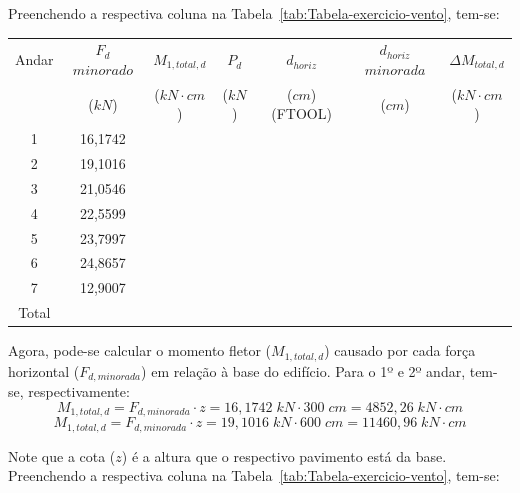 Preenchendo a respectiva coluna na Tabela~\ref{tab:Tabela-exercicio-vento}, tem-se:

\begin{table}[H]
\centering
\begin{tabular}{c|c|c|ccc|c}
\hline
Andar & $F_d$ $minorado$ & $M_{1, total, d}$ & \multicolumn{1}{c|}{$P_d$} & \multicolumn{1}{c|}{$d_{horiz}$} & $d_{horiz}$ $minorada$ & $\Delta M_{total, d}$ \\
 & ($kN$) & ($kN\cdot cm$) & \multicolumn{1}{c|}{($kN$)} & \multicolumn{1}{c|}{($cm$) (FTOOL)} & ($cm$) & ($kN\cdot cm$) \\ \hline
1 & 16,1742 &  & \multicolumn{1}{c|}{} & \multicolumn{1}{c|}{} &  &  \\
2 & 19,1016 &  & \multicolumn{1}{c|}{} & \multicolumn{1}{c|}{} &  &  \\
3 & 21,0546 &  & \multicolumn{1}{c|}{} & \multicolumn{1}{c|}{} &  &  \\
4 & 22,5599 &  & \multicolumn{1}{c|}{} & \multicolumn{1}{c|}{} &  &  \\
5 & 23,7997 &  & \multicolumn{1}{c|}{} & \multicolumn{1}{c|}{} &  &  \\
6 & 24,8657 &  & \multicolumn{1}{c|}{} & \multicolumn{1}{c|}{} &  &  \\
7 & 12,9007 &  & \multicolumn{1}{c|}{} & \multicolumn{1}{c|}{} &  &  \\ \hline
Total &  &  &  &  &  &  \\ \cline{1-1} \cline{3-3} \cline{7-7} 
\end{tabular}
\end{table}

Agora, pode-se calcular o momento fletor ($M_{1, total, d}$) causado por cada força horizontal ($F_{d, minorada}$) em relação à base do edifício. Para o 1º e 2º andar, tem-se, respectivamente:
$$M_{1, total, d}=F_{d, minorada}\cdot z=16,1742\;kN\cdot 300\;cm=4852,26\;kN\cdot cm$$
$$M_{1, total, d}=F_{d, minorada}\cdot z=19,1016\;kN\cdot 600\;cm=11460,96\;kN\cdot cm$$

Note que a cota ($z$) é a altura que o respectivo pavimento está da base. Preenchendo a respectiva coluna na Tabela~\ref{tab:Tabela-exercicio-vento}, tem-se:

